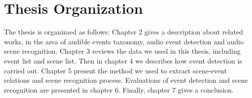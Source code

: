 \section{Thesis Organization}
The thesis is organizaed as follows: Chapter 2 gives a description about related works, in the area of audible events taxonomy, audio event detection and audio scene recognition. 
Chapter 3 reviews the data we used in this thesis, including event list and scene list. 
Then in chapter 4 we describes how event detection is carried out. 
Chapter 5 present the method we used to extract scene-event relations and scene recognition process. 
Evaluations of event detection and scene recognition are presented in chapter 6. 
Finally, chapter 7 gives a conclusion.   

